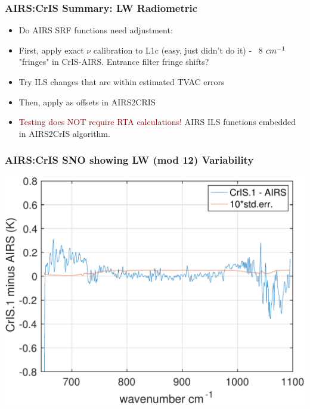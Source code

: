 \documentclass[10pt,t]{beamer}
\begin{document}
\begin{frame}
  \frametitle{}
  \begin{center}
  \end{center}
  
\end{frame}
\begin{frame}
  \frametitle{AIRS:CrIS Summary: LW Radiometric}
  \begin{itemize}
  \item Do AIRS SRF functions need adjustment:
    \item First, apply exact $\nu$ calibration to L1c (easy, just didn't do it)
      - ~8 $cm^{-1}$ "fringes" in CrIS-AIRS.  Entrance filter fringe shifts?
    \item Try ILS changes that are within estimated TVAC errors
    \item Then, apply as offsets in AIRS2CRIS
    \item \textcolor{maroon}{Testing does NOT require RTA calculations!}  AIRS ILS functions embedded in AIRS2CrIS algorithm.
      
  \end{itemize}
  
\end{frame}
\begin{frame}
  \frametitle{AIRS:CrIS SNO showing LW (mod 12) Variability}
  \begin{center}
    \includegraphics[width=0.95\linewidth]{./Figs/sno_ac1_lr_lw_2018d007e040_mean_bias.pdf}
  \end{center}
  
\end{frame}
\end{document}
